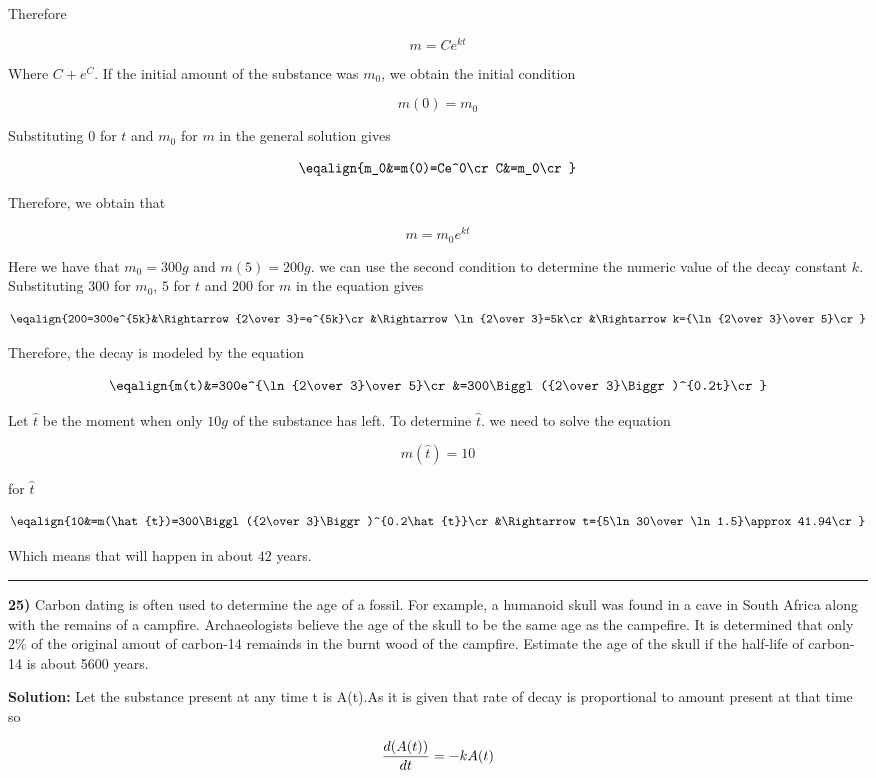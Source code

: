 Therefore

$$m=Ce^{kt}$$

Where $C+e^C$. If the initial amount of the substance was $m_0$, we obtain the initial condition

$$m(0)=m_0$$

Substituting $0$ for $t$ and $m_0$ for $m$ in the general solution gives

$$\eqalign{m_0&=m(0)=Ce^0\cr
	C&=m_0\cr}$$

Therefore, we obtain that

$$m=m_0e^{kt}$$

Here we have that $m_0=300g$ and $m(5)=200g$. we can use the second condition to determine the numeric value of the decay constant $k$. Substituting $300$ for $m_0$, $5$ for $t$ and $200$ for $m$ in the equation gives

$$\eqalign{200=300e^{5k}&\Rightarrow {2\over 3}=e^{5k}\cr
	&\Rightarrow \ln{2\over 3}=5k\cr
	&\Rightarrow k={\ln{2\over 3}\over 5}\cr}$$

Therefore, the decay is modeled by the equation

$$\eqalign{m(t)&=300e^{\ln{2\over 3}\over 5}\cr
		&=300\Biggl({2\over 3}\Biggr)^{0.2t}\cr}$$

Let $\hat{t}$ be the moment when only $10g$ of the substance has left. To determine $\hat{t}$. we need to solve the equation

$$m(\hat{t})=10$$

for $\hat{t}$

$$\eqalign{10&=m(\hat{t})=300\Biggl({2\over 3}\Biggr)^{0.2\hat{t}}\cr
	&\Rightarrow t={5\ln 30\over \ln 1.5}\approx 41.94\cr}$$

Which means that will happen in about $42$ years.

\vskip 1mm
\hrule

\vskip 1cm
{\bf 25)} Carbon dating is often used to determine the age of a fossil. For example, a humanoid skull was found in a cave in South Africa along with the remains of a campfire. Archaeologists believe the age of the skull to be the same age as the campefire. It is determined that only $2\%$ of the original amout of carbon-14 remainds in the burnt wood of the campfire. Estimate the age of the skull if the half-life of carbon-14 is about 5600 years.

\vskip 1cm
{\bf Solution:} Let the substance present at any time t is A(t).As it is given that rate of decay is proportional to amount present at that time so

$${d(A(t))\over dt}=-kA(t)$$

